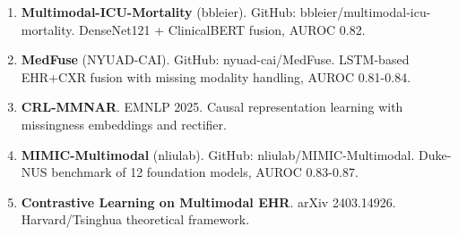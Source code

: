 \documentclass[11pt,a4paper]{article}
\begin{document}
\begin{enumerate}[leftmargin=1.5em]
    \item \textbf{Multimodal-ICU-Mortality} (bbleier). GitHub: bbleier/multimodal-icu-mortality. DenseNet121 + ClinicalBERT fusion, AUROC 0.82.
    
    \item \textbf{MedFuse} (NYUAD-CAI). GitHub: nyuad-cai/MedFuse. LSTM-based EHR+CXR fusion with missing modality handling, AUROC 0.81-0.84.
    
    \item \textbf{CRL-MMNAR}. EMNLP 2025. Causal representation learning with missingness embeddings and rectifier.
    
    \item \textbf{MIMIC-Multimodal} (nliulab). GitHub: nliulab/MIMIC-Multimodal. Duke-NUS benchmark of 12 foundation models, AUROC 0.83-0.87.
    
    \item \textbf{Contrastive Learning on Multimodal EHR}. arXiv 2403.14926. Harvard/Tsinghua theoretical framework.
\end{enumerate}
\end{document}
